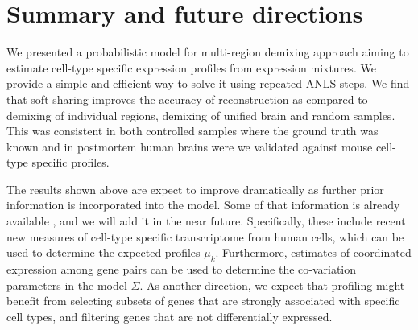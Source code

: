 \documentclass{article} %
\begin{document}
\section{Summary and future directions}
We presented a probabilistic model for multi-region demixing approach aiming to estimate cell-type specific expression profiles from expression mixtures. We provide a simple and efficient way to solve it using repeated ANLS steps. We find that soft-sharing improves the accuracy of reconstruction as compared to demixing of individual regions, demixing of unified brain and random samples. This was consistent in both controlled samples where the ground truth was known and in postmortem human brains were we validated against mouse cell-type specific profiles.

The results shown above are expect to improve dramatically as further prior information is incorporated into the model. Some of that information is already available \cite{darmanis2015survey}, and we will add it in the near future.  Specifically, these include recent new measures of cell-type specific transcriptome from human cells, which can be used to determine the expected profiles $\mu_k$. Furthermore, estimates of coordinated expression among gene pairs can be used to determine the co-variation parameters in the model $\Sigma$.
As another direction, we expect that profiling might benefit from selecting subsets of genes that are strongly associated with specific cell types, and filtering genes that are not differentially expressed.

\newpage

\end{document}
